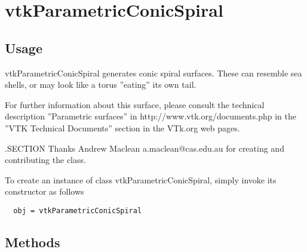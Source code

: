 \section{vtkParametricConicSpiral}

\subsection{Usage}

 vtkParametricConicSpiral generates conic spiral surfaces. These can resemble sea shells, or
 may look like a torus ''eating'' its own tail.

 For further information about this surface, please consult the 
 technical description ''Parametric surfaces'' in http://www.vtk.org/documents.php 
 in the ''VTK Technical Documents'' section in the VTk.org web pages.

 .SECTION Thanks
 Andrew Maclean a.maclean@cas.edu.au for creating and contributing the
 class.


To create an instance of class vtkParametricConicSpiral, simply
invoke its constructor as follows
\begin{verbatim}
  obj = vtkParametricConicSpiral
\end{verbatim}
\subsection{Methods}

